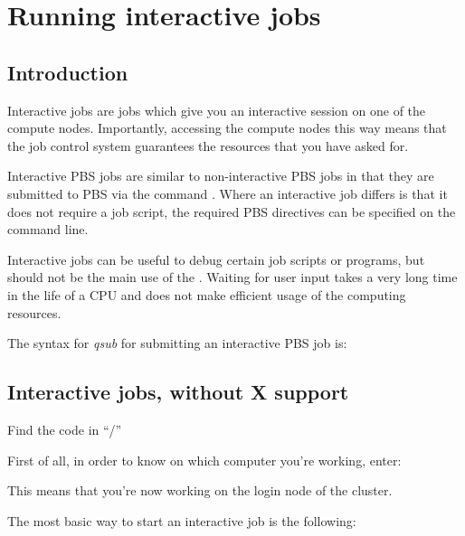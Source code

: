 \chapter{Running interactive jobs}
\label{ch:running-interactive-jobs}

\section{Introduction}

Interactive jobs are jobs which give you an interactive session on one of the
compute nodes. Importantly, accessing the compute nodes this way means that the
job control system guarantees the resources that you have asked for.

Interactive PBS jobs are similar to non-interactive PBS jobs in that they are
submitted to PBS via the command . Where an interactive job
differs is that it does not require a job script, the required PBS directives
can be specified on the command line.

Interactive jobs can be useful to debug certain job scripts or programs, but
should not be the main use of the \hpcInfra. Waiting for user input takes a
very long time in the life of a CPU and does not make efficient usage of the
computing resources.

The syntax for \emph{qsub} for submitting an interactive PBS job is:

\begin{prompt}
\end{prompt}

\section{Interactive jobs, without X support}

\begin{tip}
Find the code in
``\tilde/\exampledir''
\end{tip}

First of all, in order to know on which computer you're working, enter:

\begin{prompt}
\end{prompt}

This means that you're now working on the login node \texttt{\loginhost} of
the \hpc cluster.

The most basic way to start an interactive job is the following:

